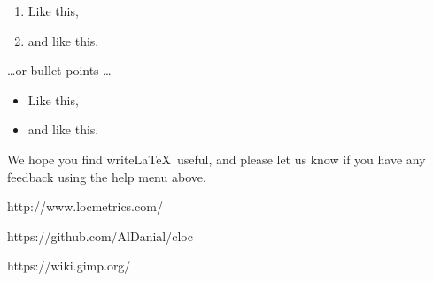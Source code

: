 \begin{enumerate}
\item Like this,
\item and like this.
\end{enumerate}
\dots or bullet points \dots
\begin{itemize}
\item Like this,
\item and like this.
\end{itemize}

We hope you find write\LaTeX\ useful, and please let us know if you have any feedback using the help menu above.

\newpage
\begin{thebibliography}{9}
	http://www.locmetrics.com/
	
	https://github.com/AlDanial/cloc
	
	https://wiki.gimp.org/
	
	
	
\end{thebibliography}
